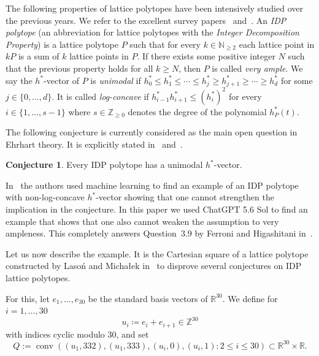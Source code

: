 \documentclass[11pt]{amsart}
\theoremstyle{definition}
\newtheorem{conj}[defn]{Conjecture}
\newcommand{\R}{\mathbb{R}}
\newcommand{\Z}{\mathbb{Z}}
\DeclareMathOperator{\conv}{conv}
\newcommand{\ZZ}{{\mathbb{Z}}}
\newcommand{\N}{{\mathbb{N}}}
\newcommand{\hs}{h^*}
\begin{document}
The following properties of lattice polytopes have been intensively studied over the previous years.
We refer to the excellent survey papers~\cite{Braun-Survey} and~\cite{Ferroni}.
An \emph{IDP polytope} (an abbreviation for lattice polytopes with the \emph{Integer Decomposition Property}) is a lattice polytope $P$ such that for every $k \in \N_{\ge 2}$ each lattice point in $kP$ is a sum of $k$ lattice points in $P$.
If there exists some positive integer $N$ such that the previous property holds for all $k \ge N$, then $P$ is called \emph{very ample}.
We say the $\hs$-vector of $P$ is \emph{unimodal} if $\hs_0 \le \hs_1 \le \cdots \le \hs_j\ge \hs_{j+1} \ge \cdots \ge \hs_d$ for some $j \in \{0, \ldots, d\}$.
It is called \emph{log-concave} if $\hs_{i-1} \hs_{i+1} \le (\hs_i)^2$ for every $i \in \{1, \ldots, s-1\}$ where $s \in \ZZ_{\ge0}$ denotes the degree of the polynomial $h_P^*(t)$. 

\smallskip

The following conjecture is currently considered as the main open question in Ehrhart theory.
It is explicitly stated in~\cite[Conjecture~1.1]{Ferroni} and~\cite[Question~1.1]{Van}.

\begin{conj}\label{unimodality}
    Every IDP polytope has a unimodal $\hs$-vector.
\end{conj}

In~\cite{IDP-paper} the authors used machine learning to find an example of an IDP polytope with non-log-concave $h^*$-vector showing that one cannot strengthen the implication in the conjecture.
In this paper we used ChatGPT 5.6 Sol to find an example that shows that one also cannot weaken the assumption to very ampleness.
This completely answers Question~3.9 by Ferroni and Higashitani in~\cite{Ferroni}.

\medskip

Let us now describe the example. It is the Cartesian square of a lattice polytope constructed by Laso\'{n} and Micha\l ek in~\cite{Mat} to disprove several conjectures on IDP lattice polytopes.

\smallskip

For this, let $e_1, \ldots, e_{30}$ be the standard basis vectors of $\R^{30}$.
We define for $i=1, \ldots, 30$
\[
    u_i \coloneqq e_i+e_{i+1}\in\Z^{30}
\]
with indices cyclic modulo $30$, and set
\[
    Q := \conv\!\left(
         (u_1, 332), (u_1, 333), (u_i, 0),(u_i, 1) : 2 \le i \le 30
     \right) \subset \R^{30} \times \R.
\]
\end{document}
